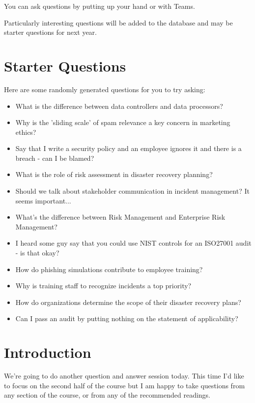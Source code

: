 \documentclass[12pt]{article}
\begin{document}
You can ask questions by putting up your hand or with Teams.  

Particularly interesting questions will be added to the database and may be starter questions for next year.  

\section*{Starter Questions} 
Here are some randomly generated questions for you to try asking: 

\begin{itemize}
  \item What is the difference between data controllers and data processors?
  \item Why is the 'sliding scale' of spam relevance a key concern in marketing ethics?
  \item Say that I write a security policy and an employee ignores it and there is a breach - can I be blamed?
  \item What is the role of risk assessment in disaster recovery planning?
  \item Should we talk about stakeholder communication in incident management? It seems important...
  \item What's the difference between Risk Management and Enterprise Risk Management?
  \item I heard some guy say that you could use NIST controls for an ISO27001 audit - is that okay?
  \item How do phishing simulations contribute to employee training?
  \item Why is training staff to recognize incidents a top priority?
  \item How do organizations determine the scope of their disaster recovery plans?
  \item Can I pass an audit by putting nothing on the statement of applicability?
\end{itemize}


%
%



\maketitle

\section*{Introduction}
We're going to do another question and answer session today. This time I'd like to focus on the second half of the course but I am happy to take questions from any section of the course, or from any of the recommended readings. 
\end{document}
